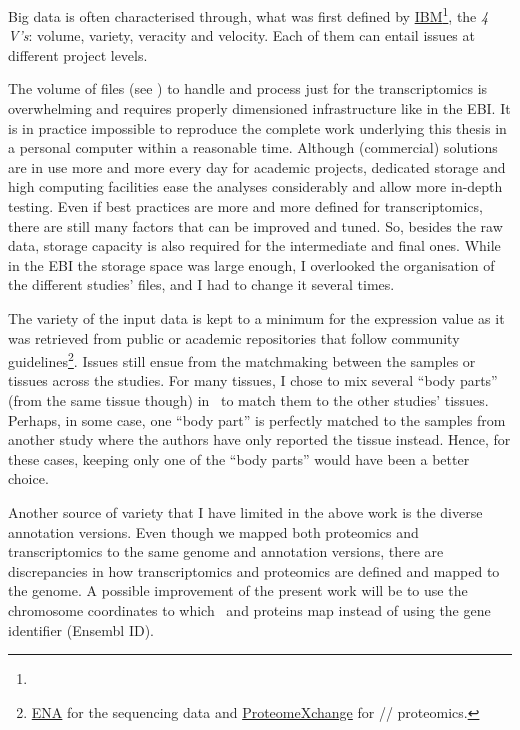 Big data is often characterised through, what was first defined by
\href{https://www.ibm.com}{IBM}\footnote{},
the \emph{4 V's}: volume, variety, veracity and velocity.
Each of them can entail issues at different project levels.

The volume of files (see )
to handle and process just for the transcriptomics
is overwhelming and requires properly dimensioned infrastructure
like in the \gls{EBI}.
It is in practice impossible to reproduce the complete work underlying
this thesis in a personal computer within a reasonable time.
Although (commercial) solutions are in use more and more every day
for academic projects,
dedicated storage and high computing facilities ease the analyses considerably
and allow more in-depth testing.
Even if best practices are more and more defined for transcriptomics,
there are still many factors that can be improved and tuned.
So, besides the raw data,
storage capacity is also required for the intermediate and final ones.
While in the \gls{EBI} the storage space was large enough,
I overlooked the organisation of the different studies' files,
and I had to change it several times.

The variety of the input data is kept to a minimum for the expression value
as it was retrieved from public or academic repositories
that follow community guidelines\footnote{%
\href{https://www.ebi.ac.uk/ena}{ENA} for the sequencing data and
\href{http://www.proteomexchange.org/}{ProteomeXchange} for \ms/\ms/ proteomics.
}.
Issues still ensue from the matchmaking
between the samples or tissues across the studies.
For many tissues, I chose to mix several \enquote{body parts}
(from the same tissue though) in \gtex\
to match them to the other studies' tissues.
Perhaps, in some case, one \enquote{body part} is perfectly matched
to the samples from another study
where the authors have only reported the tissue instead.
Hence, for these cases,
keeping only one of the \enquote{body parts}
would have been a better choice.

Another source of variety that I have limited in the above work
is the diverse annotation versions.
Even though we mapped both proteomics and transcriptomics
to the same genome and annotation versions,
there are discrepancies in how transcriptomics and proteomics
are defined and mapped to the genome.
A possible improvement of the present work will be to use
the chromosome coordinates to which \mRNAs\ and proteins map
instead of using the gene identifier (\gls{Ensembl} ID).\mybr\

